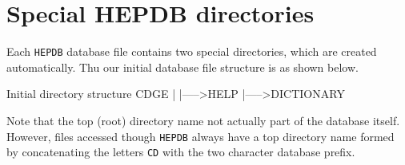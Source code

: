 \section{Special HEPDB directories}

Each {\tt HEPDB} database file contains two special directories,
which are created automatically.
Thu our initial database file structure is as shown below.
\begin{XMPt}{Initial directory structure}
CDGE
  |
  |----->HELP
  |----->DICTIONARY

\end{XMPt}
Note that the top (root) directory name not actually part of the
database itself. However, files accessed though {\tt HEPDB}
always have a top directory name formed by concatenating
the letters {\tt CD} with the two character database prefix.
%
%
%
